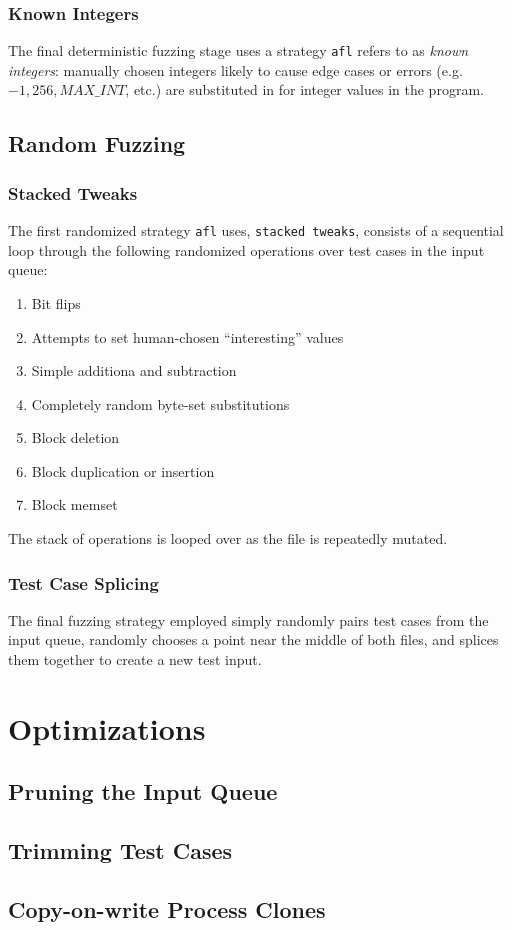 \subsubsection{Known Integers}

The final deterministic fuzzing stage uses a strategy \texttt{afl} refers
to as \textit{known integers}: manually chosen integers likely to cause
edge cases or errors (e.g. $-1, 256, MAX\_INT$, etc.) are substituted
in for integer values in the program.

\subsection{Random Fuzzing}

\subsubsection{Stacked Tweaks}

The first randomized strategy \texttt{afl} uses, \texttt{stacked tweaks},
consists of a sequential loop through the following randomized operations
over test cases in the input queue:

\begin{enumerate}
	\item Bit flips
	\item Attempts to set human-chosen ``interesting'' values
    \item Simple additiona and subtraction
    \item Completely random byte-set substitutions
    \item Block deletion
    \item Block duplication or insertion
    \item Block memset
\end{enumerate}

The stack of operations is looped over as the file is repeatedly mutated.

\subsubsection{Test Case Splicing}

The final fuzzing strategy employed simply randomly pairs test cases from
the input queue, randomly chooses a point near the middle of both files,
and splices them together to create a new test input.

\section{Optimizations}

\subsection{Pruning the Input Queue}


\subsection{Trimming Test Cases}


\subsection{Copy-on-write Process Clones}

